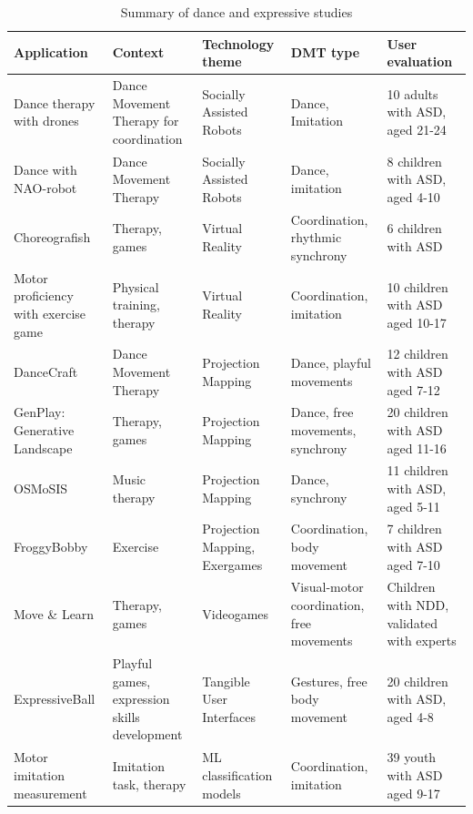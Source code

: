 \documentclass[a4paper,fleqn]{cas-sc}
\begin{document}
\begin{table}[h]
\centering
\begin{tabular}{p{}|p{}|p{}|p{}|p{}}
\hline
\textbf{Application} & \textbf{Context}  & \textbf{Technology theme} & \textbf{DMT type} & \textbf{User evaluation} \\ [0.5ex] 
 \hline
Dance therapy with drones \cite{Ascensao22} & Dance Movement Therapy for coordination & Socially Assisted Robots & Dance, Imitation & 10 adults with ASD, aged 21-24 \\
\hline
Dance with NAO-robot \cite{Suzuki17} & Dance Movement Therapy & Socially Assisted Robots & Dance, imitation & 8 children with ASD, aged 4-10\\
\hline
Choreografish \cite{AltizerJr18} & Therapy, games & Virtual Reality & Coordination, rhythmic synchrony & 6 children with ASD \\
\hline
Motor proficiency with exercise game \cite{Hocking22} & Physical training, therapy & Virtual Reality & Coordination, imitation & 10 children with ASD aged 10-17\\
\hline
DanceCraft \cite{Ringland19} & Dance Movement Therapy & Projection Mapping & Dance, playful movements & 12 children with ASD aged 7-12 \\
\hline
GenPlay: Generative Landscape \cite{Crowell18} & Therapy, games & Projection Mapping & Dance, free movements, synchrony & 20 children with ASD aged 11-16\\
\hline
OSMoSIS \cite{Ragone20, Osmosis20}  & Music therapy  & Projection Mapping & Dance, synchrony & 11 children with ASD, aged 5-11\\
\hline
FroggyBobby \cite{Caro17}  & Exercise & Projection Mapping, Exergames & Coordination, body movement & 7 children with ASD aged 7-10 \\ 
\hline
Move \& Learn \cite{Raygoza-Romero21} & Therapy, games & Videogames & Visual-motor coordination, free movements & Children with NDD, validated with experts \\
\hline
ExpressiveBall \cite{Wilson20} & Playful games, expression skills development & Tangible User Interfaces &  Gestures, free body movement & 20 children with ASD, aged 4-8 \\
\hline
Motor imitation measurement \cite{Zampella21} & Imitation task, therapy & ML classification models & Coordination, imitation & 39 youth with ASD aged 9-17 \\
\hline
\end{tabular}
\caption{Summary of dance and expressive studies}
\label{table:short-list}
\end{table}
\end{document}
